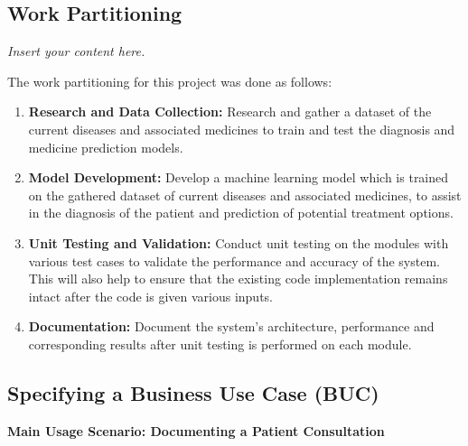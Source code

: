 \documentclass[12pt]{article}
\newcommand{\lips}{\textit{Insert your content here.}}
\begin{document}
\subsection{Work Partitioning}
\lips

The work partitioning for this project was done as follows:

\begin{enumerate}

  \item \textbf{Research and Data Collection:} Research and gather a dataset of the current diseases and associated medicines to train and test the diagnosis and medicine prediction models.\\
  \item \textbf{Model Development:} Develop a machine learning model which is trained on the gathered dataset of current diseases and associated medicines, to assist in the diagnosis of the patient and prediction of potential treatment options.\\
  \item \textbf{Unit Testing and Validation:} Conduct unit testing on the modules with various test cases to validate the performance and accuracy of the system. This will also help to ensure that the existing code implementation remains intact after the code is given various inputs.\\
  \item \textbf{Documentation:} Document the system's architecture, performance and corresponding results after unit testing is performed on each module.\\  

\end{enumerate}

\subsection{Specifying a Business Use Case (BUC)}

\textbf{Main Usage Scenario: Documenting a Patient Consultation}
\end{document}
